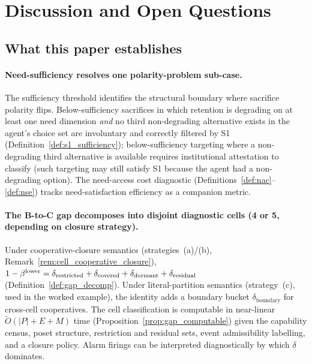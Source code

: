 \section{Discussion and Open Questions}
\label{sec:discussion}

\subsection{What this paper establishes}

\paragraph{Need-sufficiency resolves one polarity-problem
sub-case.}
The sufficiency threshold identifies the structural boundary
where sacrifice polarity flips.  Below-sufficiency sacrifices
in which retention is degrading on at least one need dimension
\emph{and} no third non-degrading alternative exists in the
agent's choice set are involuntary and correctly filtered by
S1 (Definition~\ref{def:s1_sufficiency}); below-sufficiency
targeting where a non-degrading third alternative is
available requires institutional attestation to classify
(such targeting may still satisfy S1 because the agent had a
non-degrading option).  The need-access cost
diagnostic (Definitions~\ref{def:nac}--\ref{def:nse}) tracks
need-satisfaction efficiency as a companion metric.

\paragraph{The B-to-C gap decomposes into disjoint
diagnostic cells (4 or 5, depending on closure strategy).}
Under cooperative-closure semantics (strategies~(a)/(b),
Remark~\ref{rem:cell_cooperative_closure}),
$1 - \beta^{\mathrm{lower}} =
\delta_{\mathrm{restricted}} + \delta_{\mathrm{covered}} +
\delta_{\mathrm{dormant}} + \delta_{\mathrm{residual}}$
(Definition~\ref{def:gap_decomp}).  Under literal-partition
semantics (strategy~(c), used in the worked example), the
identity adds a boundary bucket
$\delta_{\mathrm{boundary}}$ for cross-cell cooperatives.
The cell classification is computable in near-linear
$\widetilde{O}(|P| + E + M)$ time
(Proposition~\ref{prop:gap_computable}) given the capability
census, poset structure, restriction and residual sets, event
admissibility labelling, and a closure policy.  Alarm firings
can be interpreted diagnostically by which $\delta$ dominates.

